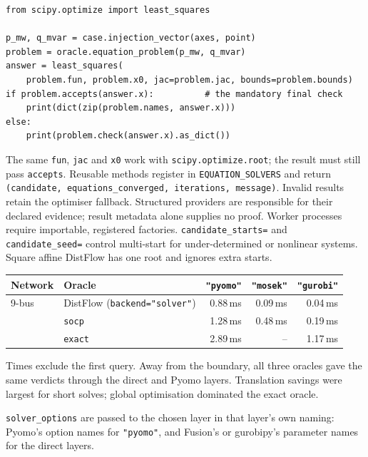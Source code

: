 \documentclass[11pt,a4paper]{report}
\newcommand{\trap}[1]{\begin{warnbox}#1\end{warnbox}}
\newcommand{\code}[1]{\texttt{\small #1}}
\begin{document}
\begin{lstlisting}
from scipy.optimize import least_squares

p_mw, q_mvar = case.injection_vector(axes, point)
problem = oracle.equation_problem(p_mw, q_mvar)
answer = least_squares(
    problem.fun, problem.x0, jac=problem.jac, bounds=problem.bounds)
if problem.accepts(answer.x):          # the mandatory final check
    print(dict(zip(problem.names, answer.x)))
else:
    print(problem.check(answer.x).as_dict())
\end{lstlisting}

The same \code{fun}, \code{jac} and \code{x0} work with
\code{scipy.optimize.root}; the result must still pass \code{accepts}.
Reusable methods register in \code{EQUATION\_SOLVERS} and return
\code{(candidate, equations\_converged, iterations, message)}.
Invalid results retain the optimiser fallback. Structured providers are
responsible for their declared evidence; result metadata alone supplies no
proof. Worker processes require importable, registered factories.
\code{candidate\_starts=} and \code{candidate\_seed=} control multi-start
for under-determined or nonlinear systems. Square affine DistFlow has one
root and ignores extra starts.

\begin{center}\small
\begin{tabular}{@{}llrrr@{}}
\toprule
Network & Oracle & \code{"pyomo"} & \code{"mosek"} & \code{"gurobi"} \\
\midrule
9-bus   & DistFlow (\code{backend="solver"}) & 0.88\,ms & 0.09\,ms & 0.04\,ms \\
        & \code{socp}                        & 1.28\,ms & 0.48\,ms & 0.19\,ms \\
        & \code{exact}                       & 2.89\,ms & --        & 1.17\,ms \\
\bottomrule
\end{tabular}
\end{center}

\noindent Times exclude the first query. Away from the boundary, all three
oracles gave the same verdicts through the direct and Pyomo layers.
Translation savings were largest for short solves; global optimisation
dominated the exact oracle.

\trap{\code{solver\_options} are passed to the chosen layer in that layer's
own naming: Pyomo's option names for \code{"pyomo"}, and Fusion's or
gurobipy's parameter names for the direct layers.}

\end{document}
